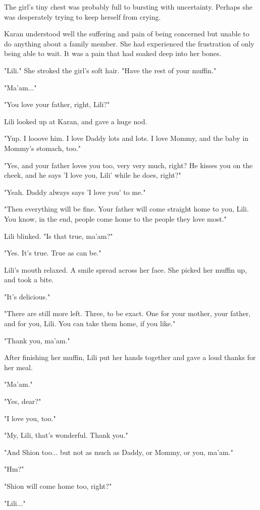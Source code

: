 The girl's tiny chest was probably full to bursting with uncertainty.
Perhaps she was desperately trying to keep herself from crying.~

Karan understood well the suffering and pain of being concerned but
unable to do anything about a family member. She had experienced the
frustration of only being able to wait. It was a pain that had soaked
deep into her bones.

"Lili." She stroked the girl's soft hair. "Have the rest of your
muffin."

"Ma'am..."

"You love your father, right, Lili?"

Lili looked up at Karan, and gave a huge nod.

"Yup. I looove him. I love Daddy lots and lots. I love Mommy, and the
baby in Mommy's stomach, too."

"Yes, and your father loves you too, very very much, right? He kisses
you on the cheek, and he says 'I love you, Lili' while he does, right?"

"Yeah. Daddy always says 'I love you' to me."

"Then everything will be fine. Your father will come straight home to
you, Lili. You know, in the end, people come home to the people they
love most."

Lili blinked. "Is that true, ma'am?"

"Yes. It's true. True as can be."

Lili's mouth relaxed. A smile spread across her face. She picked her
muffin up, and took a bite.

"It's delicious."

"There are still more left. Three, to be exact. One for your mother,
your father, and for you, Lili. You can take them home, if you like."

"Thank you, ma'am."

After finishing her muffin, Lili put her hands together and gave a loud
thanks for her meal.

"Ma'am."

"Yes, dear?"

"I love you, too."

"My, Lili, that's wonderful. Thank you."

"And Shion too... but not as much as Daddy, or Mommy, or you, ma'am."

"Hm?"

"Shion will come home too, right?"

"Lili..."

